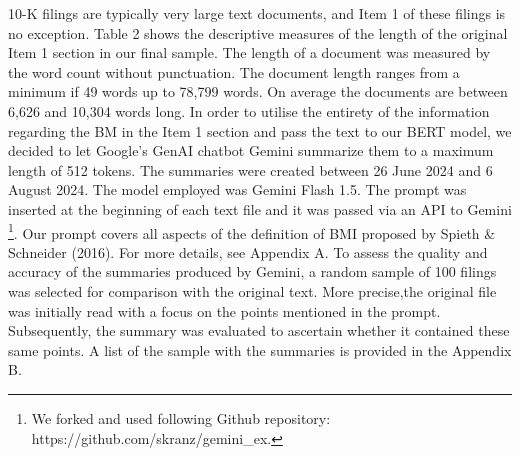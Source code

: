 \documentclass[
]{article}
\begin{document}
10-K filings are typically very large text documents, and Item 1 of
these filings is no exception. Table 2 shows the descriptive measures of
the length of the original Item 1 section in our final sample. The
length of a document was measured by the word count without punctuation.
The document length ranges from a minimum if 49 words up to 78,799
words. On average the documents are between 6,626 and 10,304 words long.
In order to utilise the entirety of the information regarding the BM in
the Item 1 section and pass the text to our BERT model, we decided to
let Google's GenAI chatbot Gemini summarize them to a maximum length of
512 tokens. The summaries were created between 26 June 2024 and 6 August
2024. The model employed was Gemini Flash 1.5. The prompt was inserted
at the beginning of each text file and it was passed via an API to
Gemini \footnote{We forked and used following Github repository:
  https://github.com/skranz/gemini\_ex.}. Our prompt covers all aspects
of the definition of BMI proposed by Spieth \& Schneider (2016). For
more details, see Appendix A. To assess the quality and accuracy of the
summaries produced by Gemini, a random sample of 100 filings was
selected for comparison with the original text. More precise,the
original file was initially read with a focus on the points mentioned in
the prompt. Subsequently, the summary was evaluated to ascertain whether
it contained these same points. A list of the sample with the summaries
is provided in the Appendix B.

\begin{table}[H]
\centering
\caption{Descriptive Statistics of Number of Words in Original Filings}
\centering
{}
\end{table}
\end{document}

